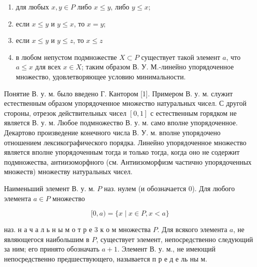 \documentclass[10pt]{article}
\begin{document}
\begin{enumerate}

  \item для любых $x, y \in P$ либо $x \leqslant y$, либо $y \leqslant x$;



  \item если $x \leqslant y$ и $y \leqslant x$, то $x=y$;



  \item если $x \leqslant y$ и $y \leqslant z$, то $x \leqslant z$



  \item в любом непустом подмножестве $X \subset P$ существует такой элемент $a$, что $a \leqslant x$ для всех $x \in X$; таким образом В. У. М.-линейно упорядоченное множество, удовлетворяющее условию минимальности.



\end{enumerate}



Понятие В. у. м. было введено Г. Кантором [1]. Примером В. у. м. служит естественным образом упорядоченное множество натуральных чисел. С другой стороны, отрезок действительных чисел $[0,1]$ с естественным горядком не является В. у. м. Любое подмножество В. у. м. само вполне упорядоченное. Декартово произведение конечного числа В. У. м. вполне упорядочено отношением лексикографического порядка. Линейно упорядоченное множество является вполне упорядоченным тогда и только тогда, когда оно не содержит подмножества, антиизоморфного (см. Антиизоморфизм частично упорядоченных множеств) множеству натуральных чисел.



Наименьший элемент В. у. м. $P$ наз. нулем (и обозначается 0). Для любого элемента $a \in P$ множество



\[

[0, a)=\{x \mid x \in P, x<a\}

\]



наз. н а ч а л ь н ы м о т р е 3 к о м множества $P$. Для всякого элемента $a$, не являющегося наибольшим в $P$, существует элемент, непосредственно следующий за ним; его принято обозначать $a+1$. Элемент В. у. м., не имеющий непосредственно предшествующего, называется п р е д е ль ны м.
\end{document}
